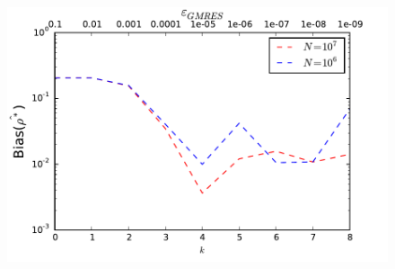 \begin{figure}
\centering
\includegraphics[width=0.7\linewidth]{../Problems/WeightedParticles/checkSystem/Newton/plots/adapt_GMREStol_every_Nstep}
\caption{}
\label{fig:adapt_GMREStol_every_Nstep}
\end{figure}



%
%




